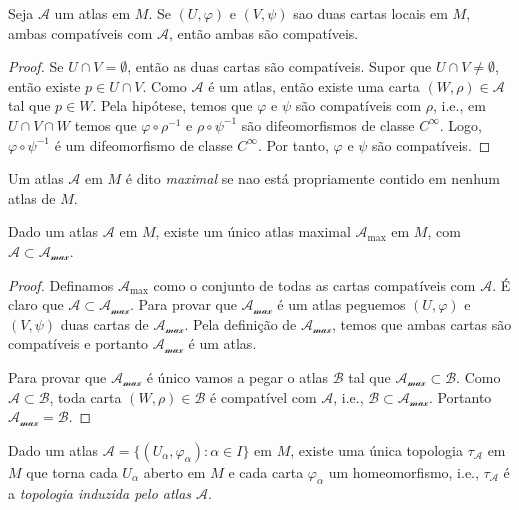 \begin{lema}
	Seja $\mathcal{A}$ um atlas em $M$. Se $(U, \varphi)$ e $(V, \psi)$ sao duas cartas locais em $M$, ambas compatíveis com $\mathcal{A}$, então ambas são compatíveis.
\end{lema}

\begin{proof}
	Se $U \cap V = \emptyset$, então as duas cartas são compatíveis. Supor que $U \cap V \neq \emptyset$, então existe $p \in U \cap V$. Como $\mathcal{A}$ é um atlas, então existe uma carta $(W, \rho) \in \mathcal{A}$ tal que $p \in W$. Pela hipótese, temos que $\varphi$ e $\psi$ são compatíveis com $\rho$, i.e., em $U \cap V \cap W$ temos que $\varphi \circ \rho^{-1}$ e $\rho \circ \psi^{-1}$ são difeomorfismos de classe $C^{\infty}$. Logo, $\varphi \circ \psi^{-1}$ é um difeomorfismo de classe $C^{\infty}$. Por tanto, $\varphi$ e $\psi$ são compatíveis. 
\end{proof}

\begin{defi}
	Um atlas $\mathcal{A}$ em $M$ é dito \emph{maximal} se nao está propriamente contido em nenhum atlas de $M$.
\end{defi}

\begin{lema}
	Dado um atlas $\mathcal{A}$ em $M$, existe um único atlas maximal $\mathcal{A}_{\text{max}}$ em $M$, com $\mathcal{A} \subset \mathcal{A_{\text{max}}}$.
\end{lema}

\begin{proof}
	Definamos $\mathcal{A}_{\text{max}}$ como o conjunto de todas as cartas compatíveis com $\mathcal{A}$. É claro que $\mathcal{A} \subset \mathcal{A_{\text{max}}}$. Para provar que $\mathcal{A_{\text{max}}}$ é um atlas peguemos $(U, \varphi)$ e $(V, \psi)$ duas cartas de $\mathcal{A_{\text{max}}}$. Pela definição de $\mathcal{A_{\text{max}}}$, temos que ambas cartas são compatíveis e portanto $\mathcal{A_{\text{max}}}$ é um atlas.
	
	Para provar que $\mathcal{A_{\text{max}}}$ é único vamos a pegar o atlas $\mathcal{B}$ tal que $\mathcal{A_{\text{max}}} \subset \mathcal{B}$. Como $\mathcal{A} \subset \mathcal{B}$, toda carta $(W, \rho) \in \mathcal{B}$ é compatível com $\mathcal{A}$, i.e., $\mathcal{B} \subset \mathcal{A_{\text{max}}}$. Portanto $\mathcal{A_{\text{max}}} = \mathcal{B}$.
\end{proof}

\begin{lema}
	Dado um atlas $\mathcal{A} = \{ (U_{\alpha}, \varphi_{\alpha}): \alpha \in I \}$ em $M$, existe uma única topologia $\tau_{\mathcal{A}}$ em $M$ que torna cada $U_{\alpha}$ aberto em $M$ e cada carta $\varphi_{\alpha}$ um homeomorfismo, i.e., $\tau_{\mathcal{A}}$ é a \emph{topologia induzida pelo atlas $\mathcal{A}$}.
\end{lema}

